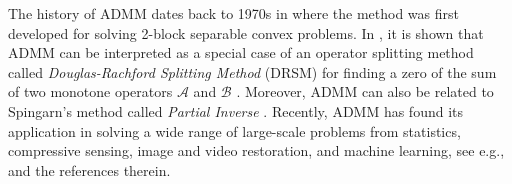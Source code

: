 \documentclass{mcom-l}
\theoremstyle{definition}
\theoremstyle{remark}
\numberwithin{equation}{section}
\begin{document}
The history of ADMM dates back to 1970s in \cite{GabayMercier1976,Glowinski1975} where the method was first developed for solving 2-block separable convex problems. In \cite{Gabay1983}, it is shown that ADMM can be interpreted as a special case of an operator splitting method called {\em{Douglas-Rachford Splitting Method}} (DRSM) for finding a zero of the sum of two monotone operators $\mathcal{A}$ and $\mathcal{B}$ \cite{DouglasRachford1956,LionsMercier1979}. Moreover, ADMM can also be related to Spingarn's method called {\em{Partial Inverse}} \cite{Spingarn1983,Spingarn1985}. Recently, ADMM has found its application in solving a wide range of large-scale problems from statistics, compressive sensing, image and video restoration, and machine learning, see e.g., \cite{BoydADMMsurvey2011,ChenHeYuan2012,GoldfarbMaScheinberg2012,HeXuYuan2011,MaXueZou2012, NgWeissYuan2010,XueMaZou2012,YangZhang2011,Yuan2012} and the references therein.
\end{document}
